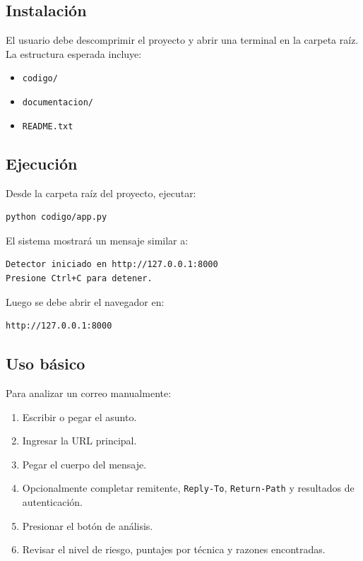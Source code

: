 \documentclass[12pt,letterpaper]{article}
\begin{document}
\subsection{Instalación}

El usuario debe descomprimir el proyecto y abrir una terminal en la carpeta raíz. La estructura esperada incluye:

\begin{itemize}
    \item \texttt{codigo/}
    \item \texttt{documentacion/}
    \item \texttt{README.txt}
\end{itemize}

\subsection{Ejecución}

Desde la carpeta raíz del proyecto, ejecutar:

\begin{verbatim}
python codigo/app.py
\end{verbatim}

El sistema mostrará un mensaje similar a:

\begin{verbatim}
Detector iniciado en http://127.0.0.1:8000
Presione Ctrl+C para detener.
\end{verbatim}

Luego se debe abrir el navegador en:

\begin{verbatim}
http://127.0.0.1:8000
\end{verbatim}

\subsection{Uso básico}

Para analizar un correo manualmente:

\begin{enumerate}
    \item Escribir o pegar el asunto.
    \item Ingresar la URL principal.
    \item Pegar el cuerpo del mensaje.
    \item Opcionalmente completar remitente, \texttt{Reply-To}, \texttt{Return-Path} y resultados de autenticación.
    \item Presionar el botón de análisis.
    \item Revisar el nivel de riesgo, puntajes por técnica y razones encontradas.
\end{enumerate}
\end{document}
